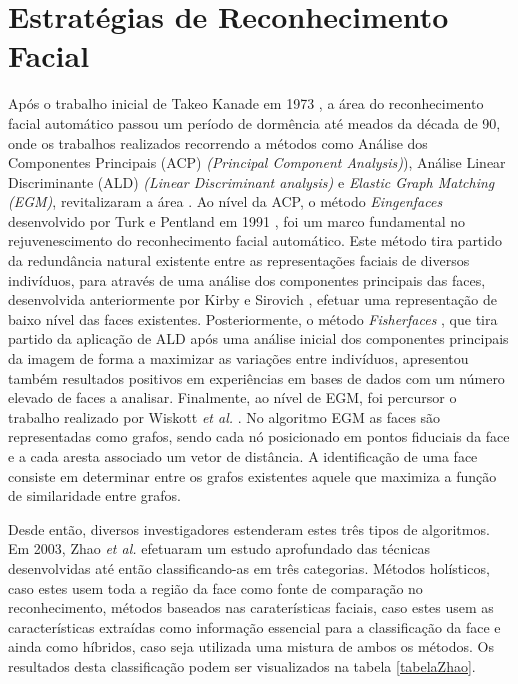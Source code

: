 \section{Estratégias de Reconhecimento Facial}\label{sec:estratégias}
Após o trabalho inicial de Takeo Kanade em 1973 \cite{Kanade1973}, a área do reconhecimento facial automático passou um período de dormência até meados da década de 90, onde os trabalhos realizados recorrendo a métodos como Análise dos Componentes Principais (ACP) \textit{(Principal Component Analysis)}), Análise Linear Discriminante (ALD) \textit{(Linear Discriminant analysis)} e \textit{Elastic Graph Matching (EGM)}, revitalizaram a área \cite{Chellappa2010}. Ao nível da ACP, o método
 \textit{Eingenfaces} desenvolvido por Turk e Pentland em 1991 \cite{Turk1991}, foi um marco fundamental no rejuvenescimento do reconhecimento facial automático. Este método tira partido da redundância natural existente entre as representações faciais de diversos indivíduos, para através de uma análise dos componentes principais das faces, desenvolvida anteriormente por Kirby e Sirovich  \cite{Kirby1990}, efetuar uma representação de baixo nível das faces existentes. Posteriormente, o método \textit{Fisherfaces} \cite{Belhumeur1997, Etemad1997, Zhao1998}, que tira partido da aplicação de ALD após uma análise inicial dos componentes principais da imagem de forma a maximizar as variações entre indivíduos, apresentou também resultados positivos em experiências em bases de dados com um número elevado de faces a analisar. Finalmente, ao nível de EGM, foi percursor o trabalho realizado por Wiskott \textit{et al.} \cite{wiskott1997face}. No algoritmo EGM as faces são representadas como grafos, sendo cada nó posicionado em pontos fiduciais da face e a cada aresta associado um vetor de distância. A identificação de uma face consiste em determinar entre os grafos existentes aquele que maximiza a função de similaridade entre grafos.
 
Desde então, diversos investigadores estenderam estes três tipos de algoritmos. Em 2003, Zhao \textit{et al.} \cite{Zhao2003} efetuaram um estudo aprofundado das técnicas desenvolvidas até então classificando-as em três categorias. Métodos holísticos, caso estes usem toda a região da face como fonte de comparação no reconhecimento, métodos baseados nas caraterísticas faciais, caso estes usem as características extraídas como informação essencial para a classificação da face e ainda como híbridos, caso seja utilizada uma mistura de ambos os métodos. Os resultados desta classificação podem ser visualizados na tabela \ref{tabelaZhao}.

